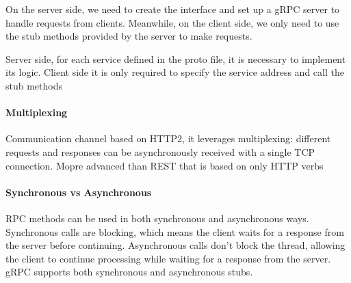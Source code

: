 On the server side, we need to create the interface and set up a gRPC server to handle requests from clients. Meanwhile, on the client side, we only need to use the stub methods provided by the server to make requests.

Server side, for each service defined in the proto file, it is necessary to implement its logic. Client side it is only required to specify the service address and call the stub methods

\paragraph{Multiplexing}
Communication channel based on HTTP$2$, it leverages multiplexing: different requests and responses can be asynchronously received with a single TCP connection. Mopre advanced than REST that is based on only HTTP verbs

\paragraph{Synchronous vs Asynchronous}
RPC methods can be used in both synchronous and asynchronous ways. Synchronous calls are blocking, which means the client waits for a response from the server before continuing. Asynchronous calls don't block the thread, allowing the client to continue processing while waiting for a response from the server. gRPC supports both synchronous and asynchronous stubs.

